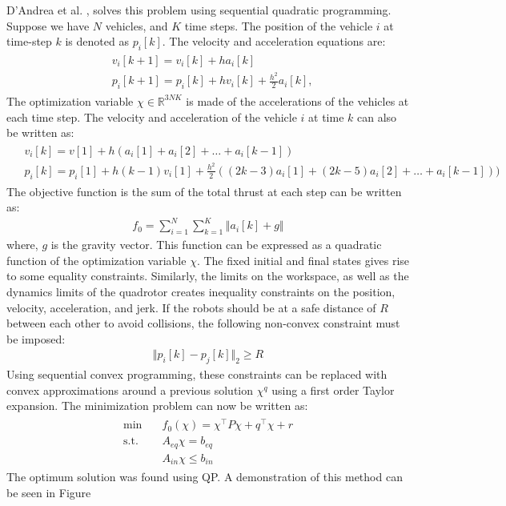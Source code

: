 D’Andrea et al. \cite{augugliaro2012generation}, solves this problem using sequential quadratic programming. Suppose we have $N$ vehicles, and $K$ time steps. The position of the vehicle $i$ at time-step $k$ is denoted as $p_i[k]$. The velocity and acceleration equations are:
\begin{align}
\begin{split}
&v_i[k+1]=v_i[k]+ha_i[k]\\
&p_i[k+1]=p_i[k] + hv_i[k] + \frac{h^2}{2}a_i[k],
\end{split}
\end{align}
The optimization variable $\chi\in \mathbb{R}^{3NK}$ is made of the accelerations of the vehicles at each time step. The velocity and acceleration of the vehicle $i$ at time $k$ can also be written as:
\begin{align}
\begin{split}
&v_i[k]=v[1] + h(a_i[1] + a_i[2] +\ldots+a_i[k-1])\\
&p_i[k]=p_i[1] + h(k-1)v_i[1] + \frac{h^2}{2}\left((2k-3)a_i[1] + (2k-5)a_i[2]+\ldots+a_i[k-1]\right))
\end{split}
\end{align}
The objective function is the sum of the total thrust at each step can be written as:
\begin{align}
f_0=\sum_{i=1}^N\sum_{k=1}^K\left\Vert a_i[k]+g\right\Vert
\end{align}
where, $g$ is the gravity vector. This function can be expressed as a quadratic function of the optimization variable $\chi$. The fixed initial and final states gives rise to some equality constraints. Similarly, the limits on the workspace, as well as the dynamics limits of the quadrotor creates inequality constraints on the position, velocity, acceleration, and jerk. If the robots should be at a safe distance of $R$ between each other to avoid collisions, the following non-convex constraint must be imposed:
\begin{align}
\Vert p_i[k]-p_j[k]\Vert_2 \geq R
\end{align} 
Using sequential convex programming, these constraints can be replaced with convex approximations around a previous solution $\chi^q$ using a first order Taylor expansion. The minimization problem can now be written as:
\begin{align}
\begin{split}
\min \quad &f_0(\chi) = \chi^\top P\chi + q^\top \chi + r \\
\text{s.t.} \quad &A_{eq}\chi=b_{eq}\\&A_{in}\chi\leq b_{in}
\end{split}
\end{align}
The optimum solution was found using QP. A demonstration of this method can be seen in Figure

